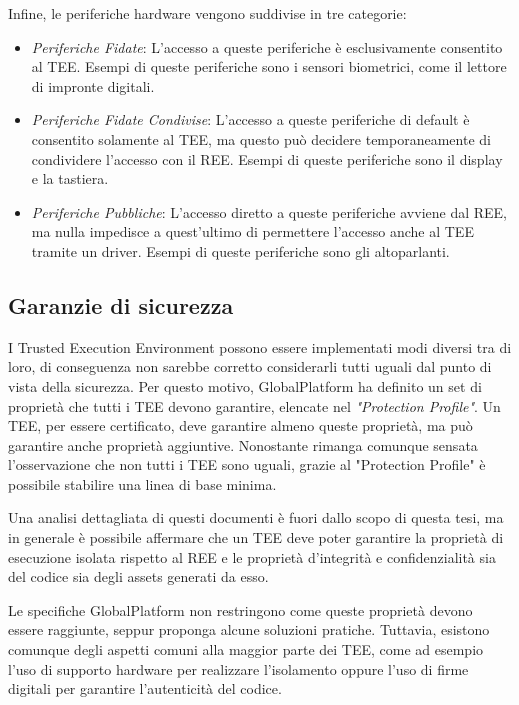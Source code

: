 \documentclass[12pt,italian]{report}
\begin{document}
\bigbreak

\noindent Infine, le periferiche hardware vengono suddivise in tre categorie:
\begin{itemize}
    \item \textit{Periferiche Fidate}: L'accesso a queste periferiche è
    esclusivamente consentito al TEE. Esempi di queste periferiche sono i
    sensori biometrici, come il lettore di impronte digitali. 
    \item \textit{Periferiche Fidate Condivise}: L'accesso a queste
    periferiche di default è consentito solamente al TEE, ma questo può
    decidere temporaneamente di condividere l'accesso con il REE. Esempi di
    queste periferiche sono il display e la tastiera.
    \item \textit{Periferiche Pubbliche}: L'accesso diretto a queste
    periferiche avviene dal REE, ma nulla impedisce a quest'ultimo di
    permettere l'accesso anche al TEE tramite un driver. Esempi di queste
    periferiche sono gli altoparlanti.
\end{itemize}

\subsection{Garanzie di sicurezza}
\label{subsec:garanzie-sicurezza}
I Trusted Execution Environment possono essere implementati modi diversi
tra di loro, di conseguenza non sarebbe corretto considerarli tutti
uguali dal punto di vista della sicurezza.
Per questo motivo, GlobalPlatform ha definito un set di proprietà che
tutti i TEE devono garantire, elencate nel
\textit{"Protection Profile"}\cite{gp2020protectionprofile}.
Un TEE, per essere certificato, deve garantire almeno queste proprietà, ma
può garantire anche proprietà aggiuntive.
Nonostante rimanga comunque sensata l'osservazione che non tutti i TEE
sono uguali, grazie al "Protection Profile" è possibile stabilire una
linea di base minima. 

Una analisi dettagliata di questi documenti è fuori dallo scopo di questa
tesi, ma in generale è possibile affermare che un TEE deve poter garantire
la proprietà di esecuzione isolata rispetto al REE e le proprietà d'integrità
e confidenzialità sia del codice sia degli assets generati da esso.

Le specifiche GlobalPlatform non restringono come queste proprietà devono
essere raggiunte, seppur proponga alcune soluzioni pratiche.
Tuttavia, esistono comunque degli aspetti comuni alla maggior parte dei
TEE, come ad esempio l'uso di supporto hardware per realizzare l'isolamento
oppure l'uso di firme digitali per garantire l'autenticità del codice.
\end{document}
